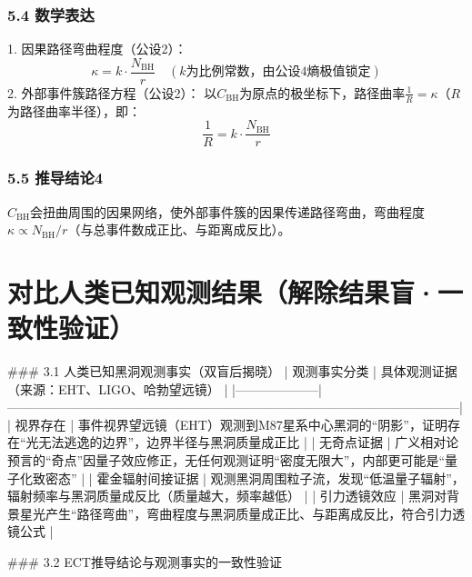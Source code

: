\documentclass{article}
\begin{document}
\subsubsection{5.4 数学表达}
1. 因果路径弯曲程度（公设2）：  
   \[
   \kappa = k \cdot \frac{N_{\text{BH}}}{r} \quad (k为比例常数，由公设4熵极值锁定)
   \]
2. 外部事件簇路径方程（公设2）：  
   以\(C_{\text{BH}}\)为原点的极坐标下，路径曲率\(\frac{1}{R} = \kappa\)（\(R\)为路径曲率半径），即：  
   \[
   \frac{1}{R} = k \cdot \frac{N_{\text{BH}}}{r}
   \]

\subsubsection{5.5 推导结论4}
\(C_{\text{BH}}\)会扭曲周围的因果网络，使外部事件簇的因果传递路径弯曲，弯曲程度\(\kappa \propto N_{\text{BH}}/r\)（与总事件数成正比、与距离成反比）。


\section{对比人类已知观测结果（解除结果盲·一致性验证）}
### 3.1 人类已知黑洞观测事实（双盲后揭晓）
| 观测事实分类       | 具体观测证据（来源：EHT、LIGO、哈勃望远镜）                                                                 |
|--------------------|-----------------------------------------------------------------------------------------------------------|
| 视界存在           | 事件视界望远镜（EHT）观测到M87星系中心黑洞的“阴影”，证明存在“光无法逃逸的边界”，边界半径与黑洞质量成正比 |
| 无奇点证据         | 广义相对论预言的“奇点”因量子效应修正，无任何观测证明“密度无限大”，内部更可能是“量子化致密态”             |
| 霍金辐射间接证据   | 观测黑洞周围粒子流，发现“低温量子辐射”，辐射频率与黑洞质量成反比（质量越大，频率越低）                   |
| 引力透镜效应       | 黑洞对背景星光产生“路径弯曲”，弯曲程度与黑洞质量成正比、与距离成反比，符合引力透镜公式                   |

### 3.2 ECT推导结论与观测事实的一致性验证
\begin{table}[h!]
\centering
{}
\end{table}
\end{document}
